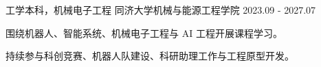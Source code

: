 
\begin{cventries}

  \cventry
    {工学本科，机械电子工程}
    {同济大学机械与能源工程学院}
    {}
    {2023.09 - 2027.07}
    {
      \begin{cvitems}
        \item {围绕机器人、智能系统、机械电子工程与 AI 工程开展课程学习。}
        \item {持续参与科创竞赛、机器人队建设、科研助理工作与工程原型开发。}
      \end{cvitems}
    }

\end{cventries}
